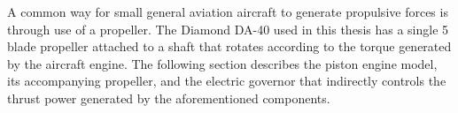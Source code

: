 \documentclass[../chapter_2.tex]{subfiles}
\begin{document}
A common way for small general aviation aircraft to generate propulsive forces is through use of a propeller. The Diamond DA-40 used in this thesis has a single 5 blade propeller attached to a shaft that rotates according to the torque generated by the aircraft engine. The following section describes the piston engine model, its accompanying propeller, and the electric governor that indirectly controls the thrust power generated by the aforementioned components.
\end{document}
